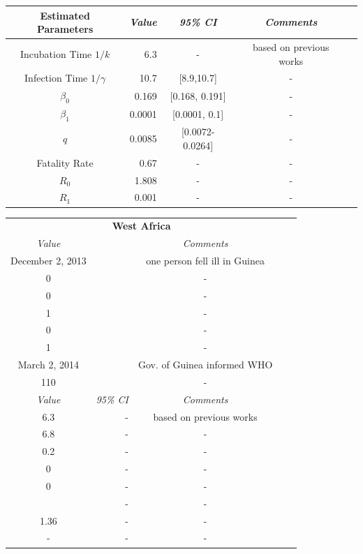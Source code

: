 \documentclass[10pt, journal,onecolumn]{IEEEtran}
\newcommand{\ra}[1]{\renewcommand{\arraystretch}{#1}}
\begin{document}
\begin{appendix}
\begin{table}
{\begin{tabular}{@{}crccc@{}}
\textbf{Estimated Parameters} & \textit{Value} & \textit{95\% CI} & \textit{Comments} \\
\midrule
Incubation Time $1/k$ &6.3 & - & based on previous works \cite{}\\
Infection Time $1/\gamma$ &10.7 & [8.9,10.7] & -\\
$\beta_0$ &0.169 & [0.168, 0.191] & -\\
$\beta_1$ &0.0001 & [0.0001, 0.1] & -\\
$q$ &0.0085 & [0.0072-0.0264] & -\\
Fatality Rate &0.67 & - & -\\
$R_0$ &1.808 &- &-\\
$R_1$ &0.001 & - &-\\
\end{tabular}
}
\parbox{.3\linewidth}{\centering
\ra{1.3}
\begin{tabular}{@{}crccc@{}}%
\multicolumn{3}{c}{\textbf{West Africa}} &  \\
\cmidrule{1-3}
 \textit{Value} && \textit{Comments} \\
\midrule
December 2, 2013 &  & one person fell ill in Guinea\\
 0& & -\\
 0& & -\\
 1& & -\\
 0& & -\\
 1& &-\\
 March 2, 2014 &  & Gov. of Guinea informed WHO\\
110 & & -\\
\midrule
 \textit{Value} & \textit{95\% CI} & \textit{Comments} \\
\midrule
6.3 & - & based on previous works \cite{}\\
6.8 & - & -\\
0.2 & - & -\\
0 & - & -\\
0 & - & -\\
 & - & -\\
1.36 &- &-\\
- & - &-\\
\end{tabular}
}
\end{table}


\end{appendix}
\end{document}
